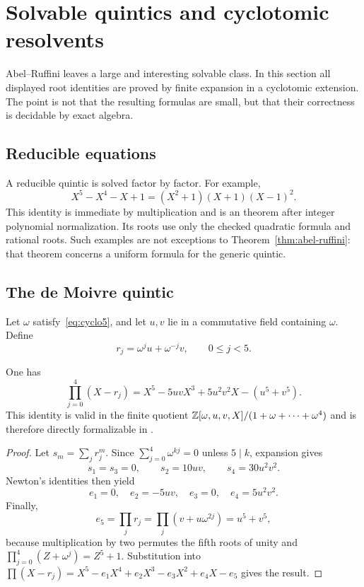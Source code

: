 \section{Solvable quintics and cyclotomic resolvents}\label{sec:solvable}

Abel--Ruffini leaves a large and interesting solvable class.  In this section
all displayed root identities are proved by finite expansion in a cyclotomic
extension.  The point is not that the resulting formulas are small, but that
their correctness is decidable by exact algebra.

\subsection{Reducible equations}

A reducible quintic is solved factor by factor.  For example,
\begin{equation}\label{eq:reducible-example}
 X^5-X^4-X+1=(X^2+1)(X+1)(X-1)^2.
\end{equation}
This identity is immediate by multiplication and is an \ipra{} theorem after
integer polynomial normalization.  Its roots use only the checked quadratic
formula and rational roots.  Such examples are not exceptions to
Theorem~\ref{thm:abel-ruffini}: that theorem concerns a uniform formula for the
generic quintic.

\subsection{The de Moivre quintic}

Let \(\omega\) satisfy~\eqref{eq:cyclo5}, and let \(u,v\) lie in a commutative
field containing \(\omega\).  Define
\[
 r_j=\omega^j u+\omega^{-j}v,
 \qquad 0\le j<5.
\]

\begin{theorem}\label{thm:de-moivre-product}
One has
\begin{equation}\label{eq:de-moivre-product}
 \prod_{j=0}^{4}(X-r_j)
 =X^5-5uvX^3+5u^2v^2X-(u^5+v^5).
\end{equation}
This identity is valid in the finite quotient
\(\mathbb Z[\omega,u,v,X]/(1+\omega+\cdots+\omega^4)\) and is therefore directly
formalizable in \ipra.
\end{theorem}

\begin{proof}
Let \(s_m=\sum_jr_j^m\).  Since
\(\sum_{j=0}^4\omega^{kj}=0\) unless \(5\mid k\), expansion gives
\[
 s_1=s_3=0,
 \qquad s_2=10uv,
 \qquad s_4=30u^2v^2.
\]
Newton's identities then yield
\[
 e_1=0,
 \quad e_2=-5uv,
 \quad e_3=0,
 \quad e_4=5u^2v^2.
\]
Finally,
\[
 e_5=\prod_jr_j
 =\prod_j(v+u\omega^{2j})=u^5+v^5,
\]
because multiplication by two permutes the fifth roots of unity and
\(\prod_{j=0}^4(Z+\omega^j)=Z^5+1\).  Substitution into
\(\prod(X-r_j)=X^5-e_1X^4+e_2X^3-e_3X^2+e_4X-e_5\) gives the result.
\end{proof}

